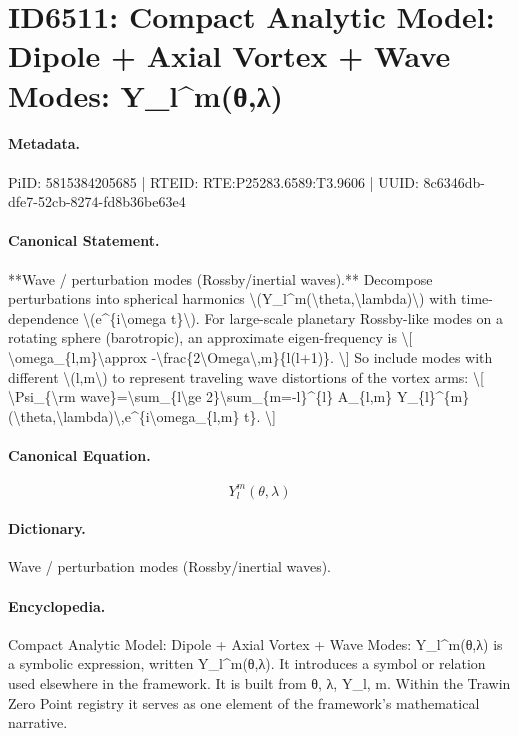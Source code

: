 \section*{ID6511: Compact Analytic Model: Dipole + Axial Vortex + Wave Modes: Y\_l\textasciicircum{}m(θ,λ)}
\paragraph{Metadata.}
PiID: 5815384205685 | RTEID: RTE:P25283.6589:T3.9606 | UUID: 8c6346db-dfe7-52cb-8274-fd8b36be63e4

\paragraph{Canonical Statement.}
**Wave / perturbation modes (Rossby/inertial waves).** Decompose perturbations into spherical harmonics \textbackslash{}(Y\_l\textasciicircum{}m(\textbackslash{}theta,\textbackslash{}lambda)\textbackslash{}) with time-dependence \textbackslash{}(e\textasciicircum{}\{i\textbackslash{}omega t\}\textbackslash{}). For large-scale planetary Rossby-like modes on a rotating sphere (barotropic), an approximate eigen-frequency is \textbackslash{}[ \textbackslash{}omega\_\{l,m\}\textbackslash{}approx -\textbackslash{}frac\{2\textbackslash{}Omega\textbackslash{},m\}\{l(l+1)\}. \textbackslash{}] So include modes with different \textbackslash{}(l,m\textbackslash{}) to represent traveling wave distortions of the vortex arms: \textbackslash{}[ \textbackslash{}Psi\_\{\textbackslash{}rm wave\}=\textbackslash{}sum\_\{l\textbackslash{}ge 2\}\textbackslash{}sum\_\{m=-l\}\textasciicircum{}\{l\} A\_\{l,m\} Y\_\{l\}\textasciicircum{}\{m\}(\textbackslash{}theta,\textbackslash{}lambda)\textbackslash{},e\textasciicircum{}\{i\textbackslash{}omega\_\{l,m\} t\}. \textbackslash{}]

\paragraph{Canonical Equation.}
\[
Y_l^m(\theta,\lambda)
\]

\paragraph{Dictionary.}
Wave / perturbation modes (Rossby/inertial waves).

\paragraph{Encyclopedia.}
Compact Analytic Model: Dipole + Axial Vortex + Wave Modes: Y\_l\textasciicircum{}m(θ,λ) is a symbolic expression, written Y\_l\textasciicircum{}m(θ,λ). It introduces a symbol or relation used elsewhere in the framework. It is built from θ, λ, Y\_l, m. Within the Trawin Zero Point registry it serves as one element of the framework's mathematical narrative.
